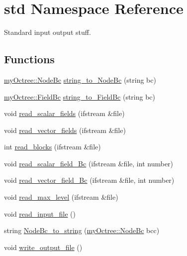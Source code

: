 \hypertarget{namespacestd}{}\section{std Namespace Reference}
\label{namespacestd}


Standard input output stuff.  


\subsection*{Functions}
\begin{DoxyCompactItemize}
\item 
\hyperlink{namespacemy_octree_adc4c8dcd84e804f57592145c650dd017}{my\+Octree\+::\+Node\+Bc} \hyperlink{namespacestd_a28f47ba2af0956e46539c75df9079bee}{string\+\_\+to\+\_\+\+Node\+Bc} (string bc)
\item 
\hyperlink{namespacemy_octree_a1b5634e126358fc57232cfc9e6d96ad9}{my\+Octree\+::\+Field\+Bc} \hyperlink{namespacestd_aafcff7000e33dc3da00fe6f5c22c651b}{string\+\_\+to\+\_\+\+Field\+Bc} (string bc)
\item 
void \hyperlink{namespacestd_aeec51f61b937e6cf3e542687f3636a4a}{read\+\_\+scalar\+\_\+fields} (ifstream \&file)
\item 
void \hyperlink{namespacestd_a04e2c7d1a7df837f0941672347cd9d1d}{read\+\_\+vector\+\_\+fields} (ifstream \&file)
\item 
int \hyperlink{namespacestd_a2b8397b2c3a0b862d83ff19fc5ca7b1e}{read\+\_\+blocks} (ifstream \&file)
\item 
void \hyperlink{namespacestd_acc83c5284b63a3a41319f6cd7c6795aa}{read\+\_\+scalar\+\_\+field\+\_\+\+Bc} (ifstream \&file, int number)
\item 
void \hyperlink{namespacestd_a87b6dd1afc7a92d8b84cf59856d73f85}{read\+\_\+vector\+\_\+field\+\_\+\+Bc} (ifstream \&file, int number)
\item 
void \hyperlink{namespacestd_a8f2d41a51a667541761e8ab1507b76d3}{read\+\_\+max\+\_\+level} (ifstream \&file)
\item 
void \hyperlink{namespacestd_aaa4c336f4a5e0573f55fcf302726c1d4}{read\+\_\+input\+\_\+file} ()
\item 
string \hyperlink{namespacestd_a633ac537d5b58f279220c1f47f64ab40}{Node\+Bc\+\_\+to\+\_\+string} (\hyperlink{namespacemy_octree_adc4c8dcd84e804f57592145c650dd017}{my\+Octree\+::\+Node\+Bc} bcc)
\item 
void \hyperlink{namespacestd_a68780ec8f77bd5ed8c056e9382a1323b}{write\+\_\+output\+\_\+file} ()
\end{DoxyCompactItemize}


